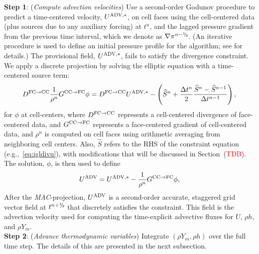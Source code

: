 {\bf Step 1}: ({\it Compute advection velocities}) Use a second-order Godunov procedure to predict a time-centered
velocity, $U^{{\rm ADV},*}$, on cell faces using the cell-centered data (plus sources due to any auxiliary forcing) at $t^n$,
and the lagged pressure gradient from the previous time interval, which we denote as $\nabla \pi^{n-\myhalf}$.  
(An iterative procedure is used to define an initial pressure profile
for the algorithm; see \cite{AlmBelColHowWel98,DayBell:2000} for details.)
The provisional field, $U^{{\rm ADV},*}$, fails to 
satisfy the divergence constraint.  We apply a discrete projection by solving the elliptic equation
with a time-centered source term:
\begin{equation}
D^{{\rm FC}\rightarrow{\rm CC}}\frac{1}{\rho^n}G^{{\rm CC}\rightarrow{\rm FC}}\phi = D^{{\rm FC}\rightarrow{\rm CC}}U^{{\rm ADV},*} - \left(\widehat S^n + \frac{\Delta t^n}{2}\frac{\widehat S^n - \widehat S^{n-1}}{\Delta t^{n-1}}\right),
\end{equation}
for $\phi$ at cell-centers, where $D^{{\rm FC}\rightarrow{\rm CC}}$ represents a cell-centered divergence of face-centered data,
and $G^{{\rm CC}\rightarrow{\rm FC}}$ represents a face-centered gradient of cell-centered data, and $\rho^n$ is computed on
cell faces using arithmetic averaging from neighboring cell centers.  Also, $\widehat S$ refers to the RHS of the constraint
equation (e.g.,~\ref{eq:igldivu}), with modifications that will be discussed in Section~(\textcolor{red}{TDB}).
The solution, $\phi$, is then used to define
\begin{equation}
U^{\rm ADV} = U^{{\rm ADV},*} - \frac{1}{\rho^n}G^{{\rm CC}\rightarrow{\rm FC}}\phi,
\end{equation}
After the \textit{MAC}-projection, $U^{\rm ADV}$ is a second-order accurate, staggered grid vector
field at $t^{n+\myhalf}$ that discretely satisfies the constraint.  This field is the advection velocity used for computing
the time-explicit advective fluxes for $U$, $\rho h$, and $\rho Y_m$.\\

{\bf Step 2}: ({\it Advance thermodynamic variables}) Integrate $(\rho Y_m,\rho h)$ over the full time step.  The details of this are presented in the next subsection.\\

